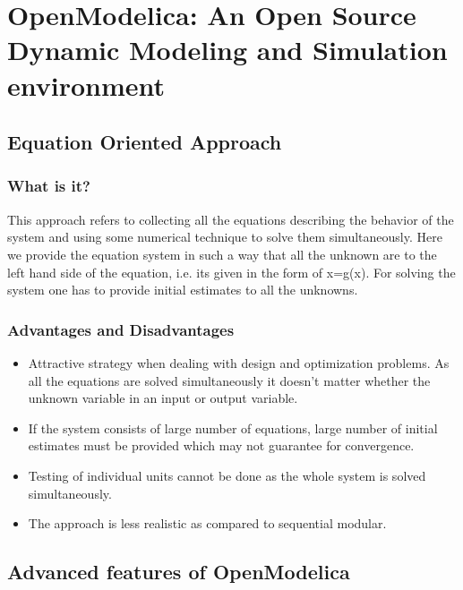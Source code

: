 \documentclass[12pt]{report}
\begin{document}
\chapter{OpenModelica: An Open Source Dynamic Modeling and Simulation environment}

\section{Equation Oriented Approach}
\subsection{What is it?}
This approach refers to collecting all the equations describing the behavior of the system and using some numerical technique to solve them simultaneously. Here we provide the equation system in such a way that all the unknown are to the left hand side of the equation, i.e. its given in the form of x=g(x). For solving the system one has to provide initial estimates to all the unknowns.

\subsection{Advantages and Disadvantages}
\begin{itemize}
\item {Attractive strategy when dealing with design and optimization problems. As all the equations are solved simultaneously it doesn't  matter whether the unknown variable in an input or output variable.}
\item{If the system consists of large number of equations, large number of initial estimates must be provided which may not guarantee for convergence.}
\item{Testing of individual units cannot be done as the whole system is solved simultaneously.}
\item{The approach is less realistic as compared to sequential modular.}
\end{itemize}


\section{Advanced features of OpenModelica}
\end{document}
